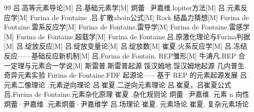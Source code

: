 \documentclass[12pt,a4paper]{article}%
\begin{document}
\begin{thebibliography}{99}
	吕.高等元素导论[M]
	吕.基础元素学[M]
	炯蕾·尹嘉维.lopiter方法[M]
	吕.元素反应学[M]
	Furina de Fontaine .吕.扩散aboin公式[M]
	Rock.结晶力猜想[M]
	Furina de Fontaine.雷系反应学[M]
	Furina de Fontaine.雷导学[M]
	Furina de Fontaine.雷感学[M]
	Furina de Fontaine.超载学[M]
	Furina de Fontaine.吕.原激化理论与Furina判据[M]
	吕.绽放反应[M]
	吕.绽放变量论[M]
	吕.绽放数[M]
	崔夏.火系反应学[M]
	吕.冻结反应——基础反应新机制[M]
	吕.Furina de Fontain. REP雏形[M]
	牛涛凡.REP 合一定理与元素合一学说[M]
	斯雷普.斯雷普起源
	馁汉姆地.馁汉姆地起源
	几内普生.奇异元素实验
	Furina de Fontaine.FDF 起源论——基于 REP 的元素起源发展
	吕.元素二像理论
	.元素逆向理论
	吕.崔夏.二逆向元素理论
	吕.崔夏，吕崔夏公式
	吕.Furina de Fontaine.元素杂化原理
	崔夏 .杂化规则论
	炯蕾·尹嘉维. 元素 n 向性
	炯蕾·尹嘉维 .元素炯蕾·尹嘉维学
	吕.场理论
	崔夏. 元素场论
	崔夏. 复杂元素场论

\end{thebibliography}



\end{document}
